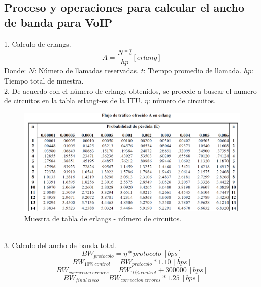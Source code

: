 \documentclass[12pt,letterpaper]{article}
\begin{document}
\newpage
\subsection{Proceso y operaciones para calcular el ancho de banda para VoIP}
1. Calculo de erlangs.
\begin{equation}
    A=\frac{N* \overline{t}}{hp}[erlang]
\end{equation}
Donde: \newline
$N$: Número de llamadas reservadas. \newline
$\overline{t}$: Tiempo promedio de llamada. \newline
$hp$: Tiempo total de muestra. \newline
\\
2. De acuerdo con el número de erlangs obtenidos, se procede a buscar el numero de circuitos 
en la tabla erlangt-es de la ITU. $\eta$: número de circuitos.
\begin{figure}[ht]
    \centering
    \includegraphics[width=.8\textwidth]{imagenes/tablaerlang.PNG}
    \caption{Muestra de tabla de erlangs - número de circuitos.}
\end{figure}
\\
3. Calculo del ancho de banda total.
\begin{equation}
    BW_{protocolo}=\eta * protocolo \ [bps]
\end{equation}
\begin{equation}
    BW_{10\% \ control}=BW_{protocolo}*1.10 \ [bps]
\end{equation}
\begin{equation}
    BW_{correccion \ errores}=BW_{10\% \ control}+300000 \ [bps]
\end{equation}
\begin{equation}
    BW_{final \ cisco}=BW_{correccion \ errores}*1.25 \ [bps]
\end{equation}
\end{document}

